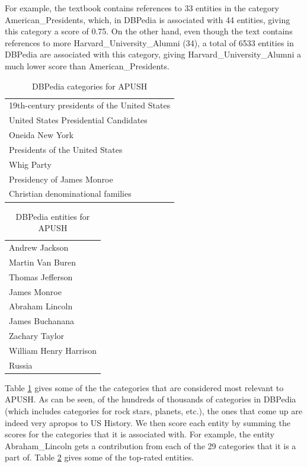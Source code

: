 \documentclass[pdfpagelabels=false,plainpages=true]{acm_proc_article-sp}
\begin{document}
For example, the textbook contains references to 33 entities in the category
American\_Presidents, which, in DBPedia is associated with 44 entities, giving
this category a score of 0.75. On the other hand, even though the text contains
references to more Harvard\_University\_Alumni (34), a total of 6533 entities in
DBPedia are associated with this category, giving Harvard\_University\_Alumni a
much lower score than American\_Presidents. 

\begin{table}
\begin{center}
\begin{tabular}{|l|} \hline
19th-century presidents of the United States \\
United States Presidential Candidates \\
Oneida New York \\
Presidents of the United States \\
Whig Party \\
Presidency of James Monroe \\
Christian denominational families \\
\hline \end{tabular}
\caption{DBPedia categories for APUSH}
\label{tab-categories}
\end{center}
\end{table}

\begin{table}
\begin{center}
\begin{tabular}{|l|} \hline
Andrew Jackson \\
Martin Van Buren \\
Thomas Jefferson \\
James Monroe \\
Abraham Lincoln \\
James Buchanana \\
Zachary Taylor \\
William Henry Harrison \\
Russia \\
\hline\end{tabular}
\caption{DBPedia entities for APUSH}
\label{tab-entities}
\end{center}
\end{table}

Table \ref{tab-categories} gives some of the the categories that are considered
most relevant to APUSH. As can be seen, of the hundreds of thousands of categories in
DBPedia (which includes categories for rock stars, planets, etc.), the
ones that come up are indeed very apropos to US History.           
We then score each entity by summing the scores for the categories that it is
associated with. For example, the entity Abraham\_Lincoln gets a contribution
from each of the 29 categories that it is a part of. Table \ref{tab-entities}
gives some of the top-rated entities. 
\end{document}

